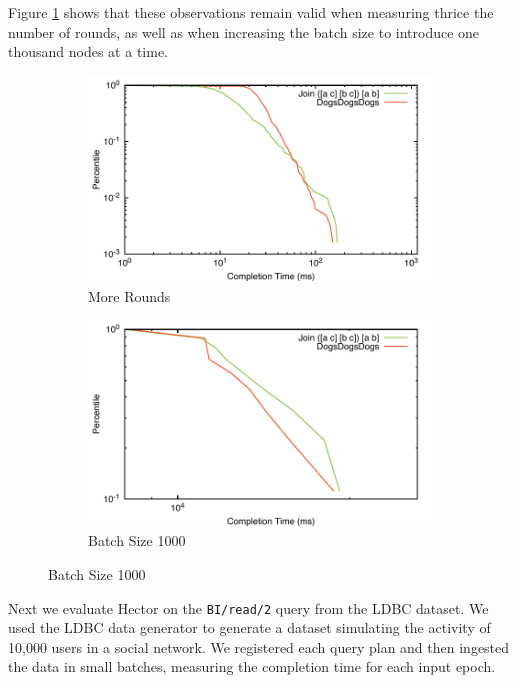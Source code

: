 \documentclass[../catalog.tex]{subfiles}
\begin{document}
Figure \ref{fig:triangle-cdfs-extended} shows that these observations
remain valid when measuring thrice the number of rounds, as well as
when increasing the batch size to introduce one thousand nodes at a
time.

\begin{figure}[h!]
  \begin{subfigure}{.5\textwidth}
    \includegraphics[width=1.0\linewidth]{results/triangles/out/extended_cdf}
    \caption{More Rounds}
  \end{subfigure}
  \begin{subfigure}{.5\textwidth}
    \includegraphics[width=1.0\linewidth]{results/triangles/out/batch_cdf}
    \caption{Batch Size 1000}
  \end{subfigure}

  \label{fig:triangle-cdfs-extended}
\end{figure}

Next we evaluate Hector on the \texttt{BI/read/2} query from the LDBC
dataset. We used the LDBC data generator to generate a dataset
simulating the activity of 10,000 users in a social network. We
registered each query plan and then ingested the data in small
batches, measuring the completion time for each input epoch.
\end{document}
